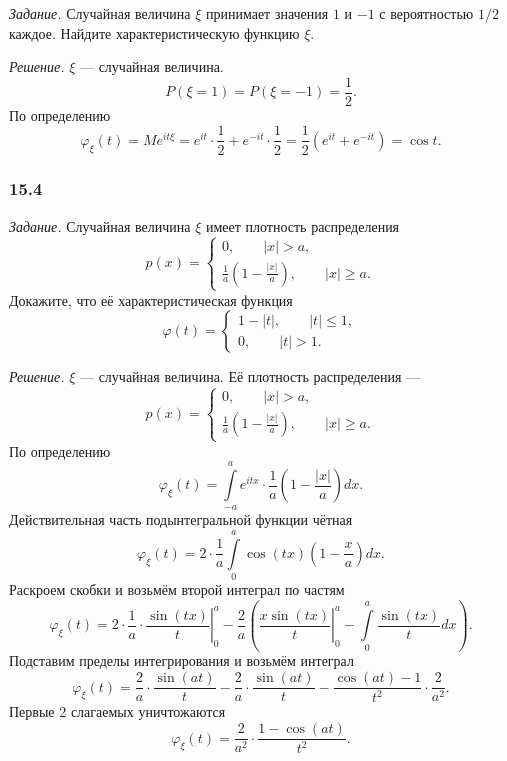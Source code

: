 \textit{Задание.}
Случайная величина $ \xi $ принимает значения $1$ и $- 1$ с вероятностью $1 / 2$ каждое.
Найдите характеристическую функцию $ \xi $.

\textit{Решение.} $ \xi $ --- случайная величина.
$$P \left( \xi = 1 \right) =
  P \left( \xi = - 1 \right) =
  \frac{1}{2}.$$
По определению
$$ \varphi_{ \xi } \left( t \right) =
  Me^{it \xi } =
  e^{it} \cdot \frac{1}{2} + e^{- it} \cdot \frac{1}{2} =
  \frac{1}{2} \left( e^{it} + e^{- it} \right) =
  \cos t.$$

\subsubsection*{15.4}

\textit{Задание.} Случайная величина $ \xi $ имеет плотность распределения
$$p \left( x \right) =
  \begin{cases}
    0, \qquad \left| x \right| > a, \\
    \frac{1}{a} \left( 1 - \frac{ \left| x \right| }{a} \right), \qquad \left| x \right| \geq a.
  \end{cases}$$
Докажите, что её характеристическая функция
$$ \varphi \left( t \right) =
  \begin{cases}
    1 - \left| t \right|, \qquad \left| t \right| \leq 1, \\
    0, \qquad \left| t \right| > 1.
  \end{cases}$$

\textit{Решение.} $ \xi $ --- случайная величина.
Её плотность распределения ---
$$p \left( x \right) =
  \begin{cases}
    0, \qquad \left| x \right| > a, \\
    \frac{1}{a} \left( 1 - \frac{ \left| x \right| }{a} \right), \qquad \left| x \right| \geq a.
  \end{cases}$$
По определению
$$ \varphi_{ \xi } \left( t \right) =
  \int \limits_{- a}^a
    e^{itx} \cdot \frac{1}{a} \left( 1 - \frac{ \left| x \right| }{a} \right) dx.$$
Действительная часть подынтегральной функции чётная
$$ \varphi_{ \xi } \left( t \right) =
  2 \cdot \frac{1}{a} \int \limits_0^a \cos \left( tx \right) \left( 1 - \frac{x}{a} \right) dx.$$
Раскроем скобки и возьмём второй интеграл по частям
$$ \varphi_{ \xi } \left( t \right) =
  \left. 2 \cdot \frac{1}{a} \cdot \frac{ \sin \left( tx \right) }{t} \right|_0^a -
  \frac{2}{a} \left( \left. \frac{x \sin \left( tx \right) }{t} \right|_0^a -
  \int \limits_0^a \frac{ \sin \left( tx \right) }{t} dx \right).$$
Подставим пределы интегрирования и возьмём интеграл
$$ \varphi_{ \xi } \left( t \right) =
  \frac{2}{a} \cdot \frac{ \sin \left( at \right) }{t} -
  \frac{2}{a} \cdot \frac{ \sin \left( at \right) }{t} -
  \frac{ \cos \left( at \right) - 1}{t^2} \cdot \frac{2}{a^2}.$$
Первые 2 слагаемых уничтожаются
$$ \varphi_{ \xi } \left( t \right) =
  \frac{2}{a^2} \cdot \frac{1 - \cos \left( at \right) }{t^2}.$$

